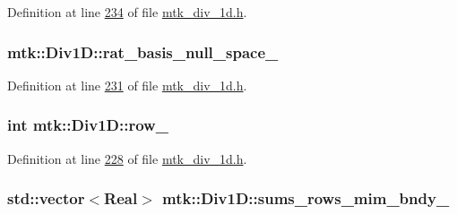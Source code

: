 Definition at line \hyperlink{mtk__div__1d_8h_source_l00234}{234} of file \hyperlink{mtk__div__1d_8h_source}{mtk\+\_\+div\+\_\+1d.\+h}.

\hypertarget{classmtk_1_1Div1D_a4f0f5589f13024b7e0edc2ac19649f9b}{
\subsubsection[{rat\+\_\+basis\+\_\+null\+\_\+space\+\_\+}]{ mtk\+::\+Div1\+D\+::rat\+\_\+basis\+\_\+null\+\_\+space\+\_\+\hspace{0.3cm}{\ttfamily [private]}}}\label{classmtk_1_1Div1D_a4f0f5589f13024b7e0edc2ac19649f9b}


Definition at line \hyperlink{mtk__div__1d_8h_source_l00231}{231} of file \hyperlink{mtk__div__1d_8h_source}{mtk\+\_\+div\+\_\+1d.\+h}.

\hypertarget{classmtk_1_1Div1D_a86d99df0e9b1e5d2943a2dcf58975556}{
\subsubsection[{row\+\_\+}]{\setlength{\rightskip}{0pt plus 5cm}int mtk\+::\+Div1\+D\+::row\+\_\+\hspace{0.3cm}{\ttfamily [private]}}}\label{classmtk_1_1Div1D_a86d99df0e9b1e5d2943a2dcf58975556}


Definition at line \hyperlink{mtk__div__1d_8h_source_l00228}{228} of file \hyperlink{mtk__div__1d_8h_source}{mtk\+\_\+div\+\_\+1d.\+h}.

\hypertarget{classmtk_1_1Div1D_aab7f0333d4156efa92e2089295decebc}{
\subsubsection[{sums\+\_\+rows\+\_\+mim\+\_\+bndy\+\_\+}]{\setlength{\rightskip}{0pt plus 5cm}std\+::vector$<${\bf Real}$>$ mtk\+::\+Div1\+D\+::sums\+\_\+rows\+\_\+mim\+\_\+bndy\+\_\+\hspace{0.3cm}{\ttfamily [private]}}}\label{classmtk_1_1Div1D_aab7f0333d4156efa92e2089295decebc}


